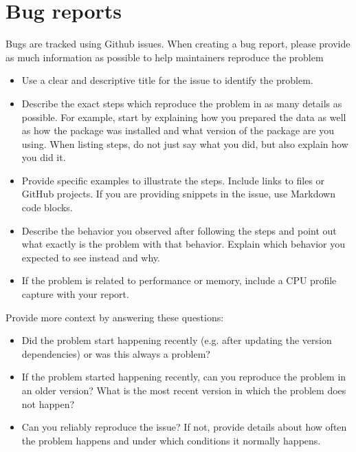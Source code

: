 \documentclass[letterpaper,10pt,english]{sphinxmanual}
\begin{document}
\section{Bug reports}
\label{\detokenize{package/contributors:bug-reports}}
Bugs are tracked using Github issues. When creating a bug report, please provide as much information as possible to help maintainers
reproduce the problem
\begin{itemize}
\item {} 
Use a clear and descriptive title for the issue to identify the problem.

\item {} 
Describe the exact steps which reproduce the problem in as many details as possible. For example, start by explaining how you prepared the data as well as how the package was installed and what version of the package are you using. When listing steps, do not just say what you did, but also explain how you did it.

\item {} 
Provide specific examples to illustrate the steps. Include links to files or GitHub projects. If you are providing snippets in the issue, use Markdown code blocks.

\item {} 
Describe the behavior you observed after following the steps and point out what exactly is the problem with that behavior.
Explain which behavior you expected to see instead and why.

\item {} 
If the problem is related to performance or memory, include a CPU profile capture with your report.

\end{itemize}

Provide more context by answering these questions:
\begin{itemize}
\item {} 
Did the problem start happening recently (e.g. after updating the version dependencies) or was this always a problem?

\item {} 
If the problem started happening recently, can you reproduce the problem in an older version? What is the most recent version in which the problem does not happen?

\item {} 
Can you reliably reproduce the issue? If not, provide details about how often the problem happens and under which conditions it normally happens.

\end{itemize}
\end{document}
